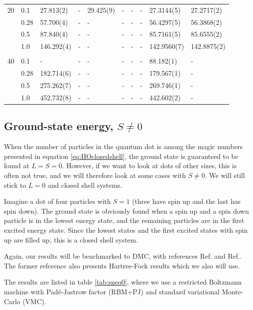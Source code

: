 {\begin{landscape}
\begin{table}
\begin{tabularx}{\hsize}{l:l|R{2.3cm}R{2.3cm}R{2.3cm}R{2.3cm}R{2.3cm}R{2.3cm}R{2.3cm}R{2.3cm}}
		20 & 0.1 & 27.813(2) & - & 29.425(9) & - & - & - & 27.3144(5) & 27.2717(2) \\ 
		& 0.28 & 57.700(4) & - & - & - & - & - & 56.4297(5) & 56.3868(2) \\
		& 0.5 & 87.840(4) & - & - & - & - & - & 85.7161(5) & 85.6555(2) \\
		& 1.0 & 146.292(4) & - & - & - & - & - & 142.9560(7) & 142.8875(2) \\ \hdashline \\
		
		40 & 0.1 & - & - & - & - & - & - & 88.182(1) & - \\ 
		& 0.28 & 182.714(6) & - & - & - & - & - & 179.567(1) & - \\
		& 0.5 & 275.262(7) & - & - & - & - & - & 269.746(1) & - \\
		& 1.0 & 452.732(8) & - & - & - & - & - & 442.602(2) & - \\ \hline\hline
	\end{tabularx}
\end{table}
\end{landscape}
}

\subsection{Ground-state energy, $S\neq0$}
When the number of particles in the quantum dot is among the magic numbers presented in equation \eqref{eq:HOclosedshell}, the ground state is guaranteed to be found at $L=S=0$. However, if we want to look at dots of other sizes, this is often not true, and we will therefore look at some cases with $S\neq 0$. We will still stick to $L=0$ and closed shell systems.

Imagine a dot of four particles with $S=1$ (three have spin up and the last has spin down). The ground state is obviously found when a spin up and a spin down particle is in the lowest energy state, and the remaining particles are in the first excited energy state. Since the lowest states and the first excited states with spin up are filled up, this is a closed shell system.

Again, our results will be benchmarked to DMC, with references Ref.\cite{pederiva_diffusion_2000} and Ref.\cite{ghosal_incipient_2007}. The former reference also presents Hartree-Fock results which we also will use. 

The results are listed in table \eqref{tab:sneq0}, where we use a restricted Boltzmann machine with Padé-Jastrow factor (RBM+PJ) and standard variational Monte-Carlo (VMC). 

